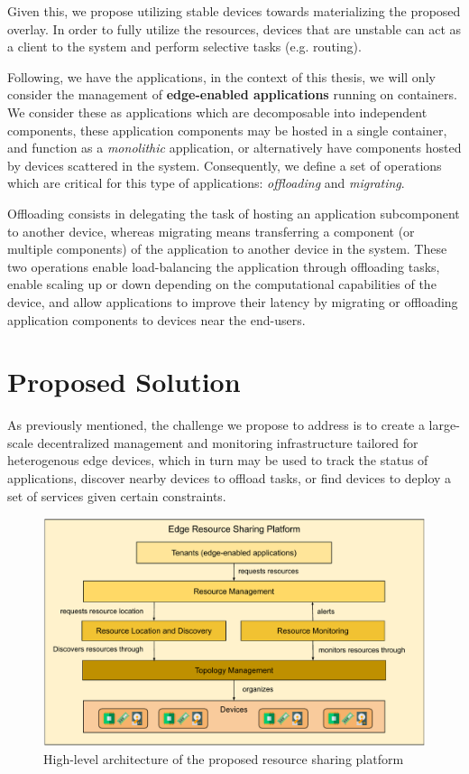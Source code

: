 Given this, we propose utilizing stable devices towards materializing the proposed overlay. In order to fully utilize the resources, devices that are unstable can act as a client to the system and perform selective tasks (e.g. routing). 

Following, we have the applications, in the context of this thesis, we will only consider the management of \textbf{edge-enabled applications} running on containers. We consider these as applications which are decomposable into independent components, these application components may be hosted in a single container, and function as a \textit{monolithic} application, or alternatively have components hosted by devices scattered in the system. Consequently, we define a set of operations which are critical for this type of applications: \textit{offloading} and \textit{migrating}.

Offloading consists in delegating the task of hosting an application subcomponent to another device, whereas migrating means transferring a component (or multiple components) of the application to another device in the system. These two operations enable load-balancing the application through offloading tasks, enable scaling up or down depending on the computational capabilities of the device, and allow applications to improve their latency by migrating or offloading application components to devices near the end-users. 

\section{Proposed Solution}
\label{cha:proposed_sol}

As previously mentioned, the challenge we propose to address is to create a large-scale decentralized management and monitoring infrastructure tailored for heterogenous edge devices, which in turn may be used to track the status of applications, discover nearby devices to offload tasks, or find devices to deploy a set of services given certain constraints. 

\begin{figure}[h]
    \centering
    \includegraphics[width=\linewidth]{Figures/proposed_architecture_detailed.pdf}
    \caption{High-level architecture of the proposed resource sharing platform}
    \label{fig:proposed_architecture_detailed}
\end{figure}

